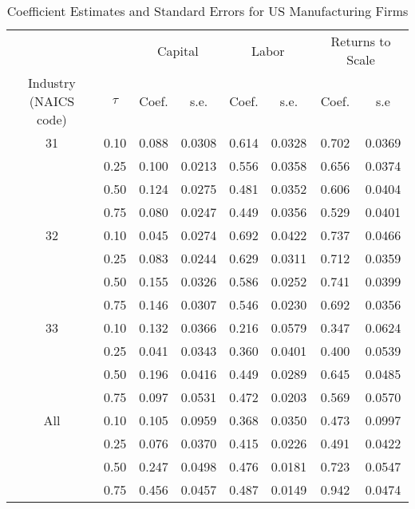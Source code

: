 \begin{table}[ht]
\centering
\caption{Coefficient Estimates and Standard Errors for US Manufacturing Firms} 
\begin{tabular}{cccccccc}
  \hline\hline & & \multicolumn{2}{c}{Capital}  & \multicolumn{2}{c}{Labor} & \multicolumn{2}{c}{Returns to Scale} \\ \cmidrule(lr){3-4} \cmidrule(lr){5-6} \cmidrule(lr){7-8}Industry (NAICS code) & $\tau$ & Coef. & s.e. & Coef. & s.e. & Coef. & s.e \\ 
  \hline
31 & 0.10 & 0.088 & 0.0308 & 0.614 & 0.0328 & 0.702 & 0.0369 \\ 
   & 0.25 & 0.100 & 0.0213 & 0.556 & 0.0358 & 0.656 & 0.0374 \\ 
   & 0.50 & 0.124 & 0.0275 & 0.481 & 0.0352 & 0.606 & 0.0404 \\ 
   & 0.75 & 0.080 & 0.0247 & 0.449 & 0.0356 & 0.529 & 0.0401 \\ 
  32 & 0.10 & 0.045 & 0.0274 & 0.692 & 0.0422 & 0.737 & 0.0466 \\ 
   & 0.25 & 0.083 & 0.0244 & 0.629 & 0.0311 & 0.712 & 0.0359 \\ 
   & 0.50 & 0.155 & 0.0326 & 0.586 & 0.0252 & 0.741 & 0.0399 \\ 
   & 0.75 & 0.146 & 0.0307 & 0.546 & 0.0230 & 0.692 & 0.0356 \\ 
  33 & 0.10 & 0.132 & 0.0366 & 0.216 & 0.0579 & 0.347 & 0.0624 \\ 
   & 0.25 & 0.041 & 0.0343 & 0.360 & 0.0401 & 0.400 & 0.0539 \\ 
   & 0.50 & 0.196 & 0.0416 & 0.449 & 0.0289 & 0.645 & 0.0485 \\ 
   & 0.75 & 0.097 & 0.0531 & 0.472 & 0.0203 & 0.569 & 0.0570 \\ 
  All & 0.10 & 0.105 & 0.0959 & 0.368 & 0.0350 & 0.473 & 0.0997 \\ 
   & 0.25 & 0.076 & 0.0370 & 0.415 & 0.0226 & 0.491 & 0.0422 \\ 
   & 0.50 & 0.247 & 0.0498 & 0.476 & 0.0181 & 0.723 & 0.0547 \\ 
   & 0.75 & 0.456 & 0.0457 & 0.487 & 0.0149 & 0.942 & 0.0474 \\ 
   \hline
\end{tabular}
\end{table}

